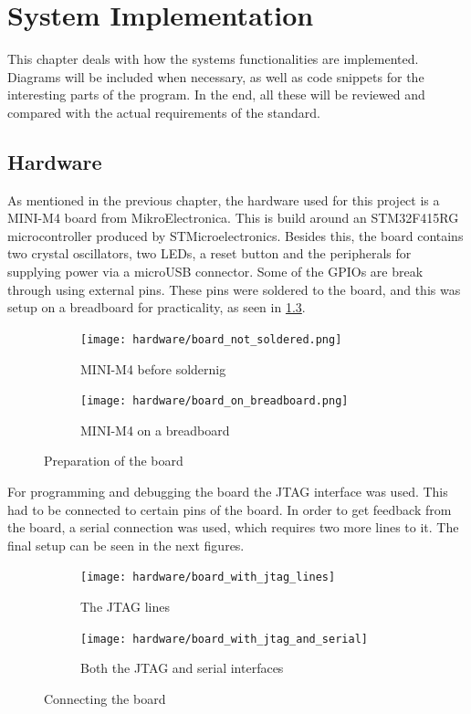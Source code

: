 
\newcommand{\excreturn}{EXC\_RETURN}

\chapter{System Implementation}
This chapter deals with how the system\textquotesingle s functionalities 
are implemented. Diagrams will be included when necessary, as well as code 
snippets for the interesting parts of the program. In the end, all these
will be reviewed and compared with the actual requirements of the standard.


\section{Hardware}

As mentioned in the previous chapter, the hardware used for this project 
is a MINI-M4 board from MikroElectronica. This is build around an
STM32F415RG microcontroller produced by STMicroelectronics. Besides
this, the board contains two crystal oscillators, two LEDs, a reset 
button and the peripherals for supplying power via a microUSB connector.
Some of the GPIOs are break through using external pins.
These pins were soldered to the board, and this was setup on a breadboard
for practicality, as seen in \ref{fig:photo1}.

\begin{figure}[H]
\begin{subfigure}{0.5\textwidth}
  \centering
  \texttt{[image: hardware/board\_not\_soldered.png]}
  \caption{MINI-M4 before soldernig}
  \label{fig:sub1}
\end{subfigure}%
\begin{subfigure}{0.5\textwidth}
  \centering
  \texttt{[image: hardware/board\_on\_breadboard.png]}
  \caption{MINI-M4 on a breadboard}
  \label{fig:sub2}
\end{subfigure}
\caption{Preparation of the board}
\label{fig:photo1}
\end{figure}

For programming and debugging the board the JTAG interface was used.
This had to be connected to certain pins of the board. In order to get 
feedback from the board, a serial connection was used, which requires two
more lines to it. The final setup can be seen in the next figures.

\begin{figure}[H]
\centering
\begin{subfigure}{.5\textwidth}
  \centering
  \texttt{[image: hardware/board\_with\_jtag\_lines]}
  \caption{The JTAG lines}
  \label{fig:sub1}
\end{subfigure}%
\begin{subfigure}{.5\textwidth}
  \centering
  \texttt{[image: hardware/board\_with\_jtag\_and\_serial]}
  \caption{Both the JTAG and serial interfaces}
  \label{fig:sub2}
\end{subfigure}
\caption{Connecting the board}
\label{fig:photo2}
\end{figure}

